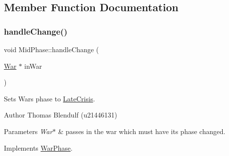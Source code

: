 \subsection{Member Function Documentation}
\mbox{\label{class_mid_phase_a7127c09e9eb9a19bb2973025760b67e8}} 
\subsubsection{\texorpdfstring{handleChange()}{handleChange()}}
{\footnotesize\ttfamily void Mid\+Phase\+::handle\+Change (\begin{DoxyParamCaption}\item[{\mbox{\hyperlink{class_war}{War}} $\ast$}]{in\+War }\end{DoxyParamCaption})\hspace{0.3cm}{\ttfamily [virtual]}}



Sets Wars phase to \mbox{\hyperlink{class_late_crisis}{Late\+Crisis}}. 

\begin{DoxyAuthor}{Author}
Thomas Blendulf (u21446131) 
\end{DoxyAuthor}

\begin{DoxyParams}{Parameters}
{\em War$\ast$} & passes in the war which must have its phase changed. \\
\hline
\end{DoxyParams}


Implements \mbox{\hyperlink{class_war_phase_a258e9480c7b3dcbdebdf86863659f1e5}{War\+Phase}}.

